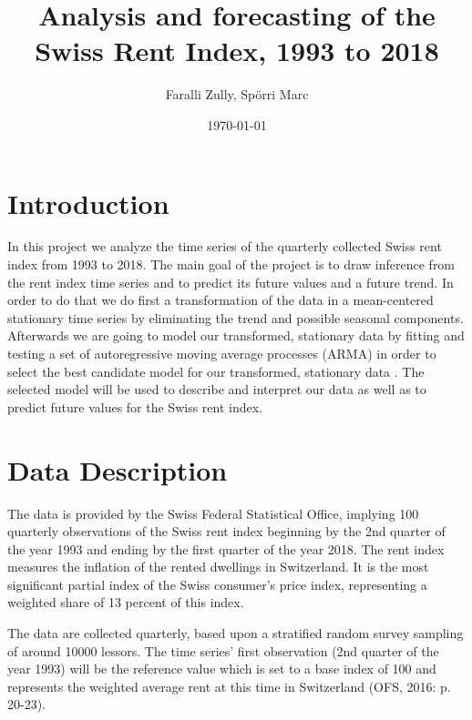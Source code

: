 \documentclass[11pt,a4paper]{article}
\title{Analysis and forecasting of the Swiss Rent Index, 1993 to 2018}
\author{Faralli Zully, Spörri Marc}
\date{\today}
\begin{document}

\maketitle
\tableofcontents
\newpage



\section{Introduction}

In this project we analyze the time series of the quarterly collected Swiss rent index from 1993 to 2018.
The main goal of the project is to draw inference from the rent index time series and to predict its future values and a future trend.
In order to do that we do first a transformation of the data in a mean-centered stationary time series by eliminating the trend and possible seasonal components.
Afterwards we are going to model our transformed, stationary data by fitting and testing a set of autoregressive moving average processes (ARMA) in order to select the best candidate model for our transformed, stationary data \cite[p.~82--110]{bd02}.
The selected model will be used to describe and interpret our data as well as to predict future values for the Swiss rent index.



\section{Data Description}

The data is provided by the Swiss Federal Statistical Office, implying 100 quarterly observations of the Swiss rent index beginning by the 2nd quarter of the year 1993 and ending by the first quarter of the year 2018.
The rent index measures the inflation of the rented dwellings in Switzerland.
It is the most significant partial index of the Swiss consumer’s price index, representing a weighted share of 13 percent of this index.

The data are collected quarterly, based upon a stratified random survey sampling of around \num{10000} lessors.
The time series' first observation (2nd quarter of the year 1993) will be the reference value which is set to a base index of 100 and represents the weighted average rent at this time in Switzerland (OFS, 2016: p. 20-23).
\end{document}
